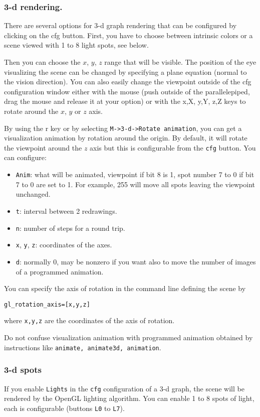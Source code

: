\documentclass{article}
\begin{document}
\subsubsection{3-d rendering.}
There are several options for 3-d graph rendering that can be
configured by clicking on the cfg button. First, you have to choose
between intrinsic colors or a scene viewed with 1 to 8 light spots, 
see below.

Then you can choose the $x$, $y$, $z$ range that will be visible.
The position of the eye visualizing the scene can be changed by
specifying a plane equation (normal to the vision direction). You
can also easily change the viewpoint outside of
the cfg configuration window either with the
mouse (push outside of the parallelepiped, drag the mouse
and release it at your option) or with the x,X, y,Y, z,Z keys to
rotate around the $x$, $y$ or $z$ axis. 

By using the r key or by selecting 
\verb|M->3-d->Rotate animation|,
you can get a visualization animation by rotation around the
origin. By default, it will rotate the viewpoint around the $z$ axis
but this is configurable from the \verb|cfg| button.  You can configure:
\begin{itemize}
\item \verb|Anim|: what will be animated, viewpoint if bit 8 is 1, 
spot number 7 to 0 if bit 7 to 0 are set to 1. For example, 255 will
move all spots leaving the viewpoint unchanged.
\item \verb|t|: interval between 2 redrawings.
\item \verb|n|: number of steps for a round trip.
\item \verb|x|, \verb|y|, \verb|z|: coordinates of the axes.
\item \verb|d|: normally 0, may be nonzero if you want also to move the
number of images of a programmed animation.
\end{itemize}
You can specify the axis of rotation in the command line defining the
scene by 
\begin{center}
\verb|gl_rotation_axis=[x,y,z]| 
\end{center}
where \verb|x,y,z|
are the coordinates of the axis of rotation.

Do not confuse visualization animation with programmed animation
obtained by instructions like \verb|animate, animate3d, animation|.

\subsubsection{3-d spots}
If you enable \verb|Lights| in the \verb|cfg| configuration of a 3-d
graph, the scene will be rendered by the OpenGL lighting
algorithm. You can enable 1 to 8 spots of light, each is configurable
(buttons \verb|L0| to \verb|L7|). 
\end{document}
